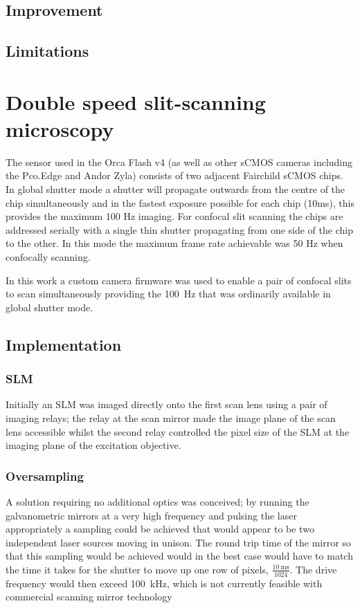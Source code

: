 \subsection{Improvement} %

\subsection{Limitations} %
\section{Double speed slit-scanning microscopy}

The sensor used in the Orca Flash v4 (as well as other sCMOS cameras including the Pco.Edge and Andor Zyla) consists of two adjacent Fairchild sCMOS chips.
In global shutter mode a shutter will propagate outwards from the centre of the chip simultaneously and in the fastest exposure possible for each chip (10ms), this provides the maximum 100 Hz imaging.
For confocal slit scanning the chips are addressed serially with a single thin shutter propagating from one side of the chip to the other.
In this mode the maximum frame rate achievable was 50 Hz when confocally scanning.

In this work a custom camera firmware was used to enable a pair of confocal slits to scan simultaneously providing the \SI{100}{\hertz} that was ordinarily available in global shutter mode.

\subsection{Implementation}
\subsubsection{SLM}
Initially an SLM was imaged directly onto the first scan lens using a pair of imaging relays; the relay at the scan mirror made the image plane of the scan lens accessible whilst the second relay controlled the pixel size of the SLM at the imaging plane of the excitation objective.

\subsubsection{Oversampling}
A solution requiring no additional optics was conceived; by running the galvanometric mirrors at a very high frequency and pulsing the laser appropriately a sampling could be achieved that would appear to be two independent laser sources moving in unison.
The round trip time of the mirror so that this sampling would be achieved would in the best case would have to match the time it takes for the shutter to move up one row of pixels, $\frac{\SI{10}{\milli\second}}{1024}$.
The drive frequency would then exceed \SI{100}{\kilo\hertz}, which is not currently feasible with commercial scanning mirror technology

